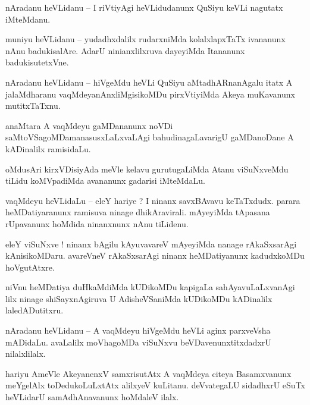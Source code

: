 \documentclass{article}
\begin{document}
\begin{mn}%
nAradanu heVLidanu -- I riVtiyAgi heVLidudanunx QuSiyu keVLi nagutatx iMteMdanu.
\end{mn}

\begin{mn}%
muniyu heVLidanu -- yudadhxdalilx rudarxniMda kolalxlapxTaTx ivananunx nAnu badukisalAre. AdarU 
ninianxlilxruva dayeyiMda Itananunx badukisutetxVne.
\end{mn}

\begin{mn}%
nAradanu heVLidanu -- hiVgeMdu heVLi QuSiyu aMtadhARnanAgalu itatx A jalaMdharanu 
vaqMdeyanAnxliMgisikoMDu pirxVtiyiMda Akeya muKavanunx mutitxTaTxnu.
\end{mn}

\begin{mn}%
anaMtara A vaqMdeyu gaMDananunx noVDi saMtoVSagoMDamanasusxLaLxvaLAgi bahudinagaLavarigU 
gaMDanoDane A kADinalilx ramisidaLu.
\end{mn}

\begin{mn}%
oMdusAri kirxVDisiyAda meVle kelavu gurutugaLiMda Atanu viSuNxveMdu tiLidu koMVpadiMda avananunx 
gadarisi iMteMdaLu.
\end{mn}

\begin{mn}%
vaqMdeyu heVLidaLu -- eleY hariye ? I ninanx savxBAvavu keTaTxdudx. parara heMDatiyaranunx ramisuva 
ninage dhikAravirali. mAyeyiMda tApasana rUpavanunx hoMdida ninanxnunx nAnu tiLidenu.
\end{mn}

\begin{mn}%
eleY viSuNxve ! ninanx bAgilu kAyuvavareV mAyeyiMda nanage rAkaSxsarAgi kAnisikoMDaru. avareVneV 
rAkaSxsarAgi ninanx heMDatiyanunx kadudxkoMDu hoVgutAtxre.
\end{mn}

\begin{mn}%
niVnu heMDatiya duHkaMdiMda kUDikoMDu kapigaLa sahAyavuLaLxvanAgi lilx ninage shiSayxnAgiruva U 
AdisheVSaniMda kUDikoMDu kADinalilx laledADutitxru.
\end{mn}

\begin{mn}%
nAradanu heVLidanu -- A vaqMdeyu hiVgeMdu heVLi aginx parxveVsha mADidaLu. avaLalilx moVhagoMDa 
viSuNxvu beVDavenunxtitxdadxrU nilalxlilalx.
\end{mn}

\begin{mn}%
hariyu AmeVle AkeyanenxV samxrisutAtx A vaqMdeya citeya Basamxvanunx meYgelAlx toDedukoLuLxtAtx 
alilxyeV kuLitanu. deVvategaLU sidadhxrU eSuTx heVLidarU samAdhAnavanunx hoMdaleV ilalx.
\end{mn}
\end{document}
